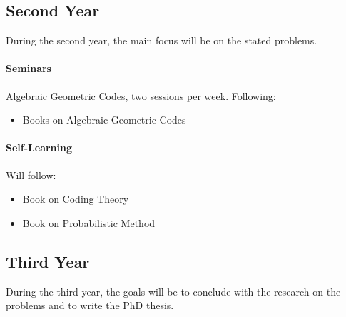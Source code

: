 \subsection*{Second Year}
During the second year, the main focus will be on the stated problems.

\paragraph*{Seminars}
Algebraic Geometric Codes, two sessions per week. Following:
\begin{itemize}
\item Books on Algebraic Geometric Codes \cite{stichtenoth, vladut}
\end{itemize}

\paragraph*{Self-Learning} Will follow:
\begin{itemize}
\item Book on Coding Theory \cite{mcwilliams}
\item Book on Probabilistic Method \cite{prob_method}
\end{itemize}

\subsection*{Third Year}
During the third year, the goals will be to conclude with the research on the problems and to write the PhD thesis.
